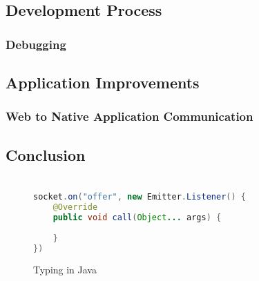\documentclass[]{report}
\begin{document}
		\section{Development Process}
			\subsection{Debugging}
		\section{Application Improvements}
			\subsection{Web to Native Application Communication}
		\section{Conclusion}
	
	\appendix
	\chapter{}
	\begin{figure}[h!]
		\caption{Typing in Java}
		\begin{lstlisting}[language=Java,frame=single,breaklines=true]
socket.on("offer", new Emitter.Listener() {
	@Override
	public void call(Object... args) {
		
	}
})
		\end{lstlisting}
	\end{figure}
\end{document}
